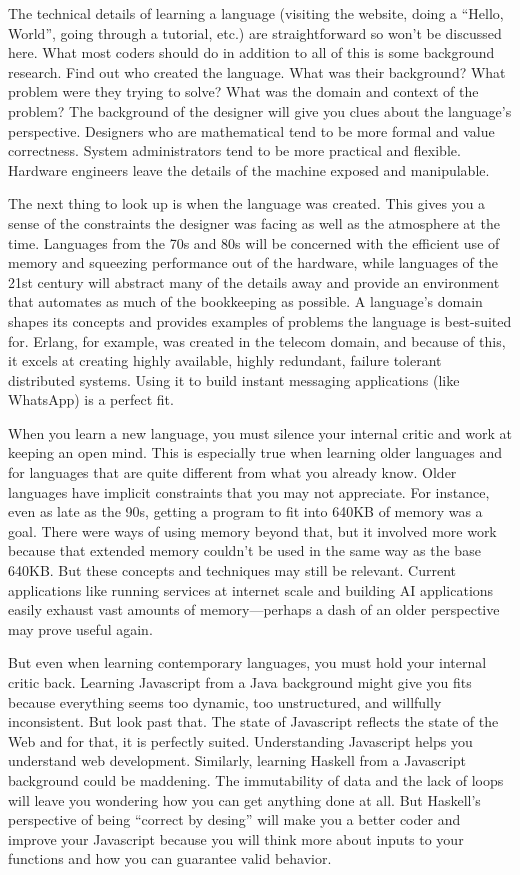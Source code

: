 The technical details of learning a language (visiting the website, doing a
``Hello, World'', going through a tutorial, etc.) are straightforward so won't
be discussed here. What most coders should do in addition to all of this is
some background research. Find out who created the language. What was their
background? What problem were they trying to solve?  What was the domain and
context of the problem? The background of the designer will give you clues
about the language's perspective. Designers who are mathematical tend to be
more formal and value correctness. System administrators tend to be more
practical and flexible. Hardware engineers leave the details of the machine
exposed and manipulable.

The next thing to look up is when the language was created. This gives you a
sense of the constraints the designer was facing as well as the atmosphere at
the time. Languages from the 70s and 80s will be concerned with the efficient
use of memory and squeezing performance out of the hardware, while languages of
the 21st century will abstract many of the details away and provide an
environment that automates as much of the bookkeeping as possible. A language's
domain shapes its concepts and provides examples of problems the language is
best-suited for. Erlang, for example, was created in the telecom domain, and
because of this, it excels at creating highly available, highly redundant,
failure tolerant distributed systems. Using it to build instant messaging
applications (like WhatsApp) is a perfect fit.

When you learn a new language, you must silence your internal critic and work
at keeping an open mind. This is especially true when learning older languages
and for languages that are quite different from what you already know. Older
languages have implicit constraints that you may not appreciate. For instance,
even as late as the 90s, getting a program to fit into 640KB of memory was a
goal. There were ways of using memory beyond that, but it involved more work
because that extended memory couldn't be used in the same way as the base
640KB. But these concepts and techniques may still be relevant. Current
applications like running services at internet scale and building AI
applications easily exhaust vast amounts of memory---perhaps a dash of an older
perspective may prove useful again.

But even when learning contemporary languages, you must hold your internal
critic back. Learning Javascript from a Java background might give you fits
because everything seems too dynamic, too unstructured, and willfully
inconsistent. But look past that. The state of Javascript reflects the state of
the Web and for that, it is perfectly suited. Understanding Javascript helps
you understand web development. Similarly, learning Haskell from a Javascript
background could be maddening. The immutability of data and the lack of loops
will leave you wondering how you can get anything done at all. But Haskell's
perspective of being ``correct by desing'' will make you a better coder and
improve your Javascript because you will think more about inputs to your
functions and how you can guarantee valid behavior.

